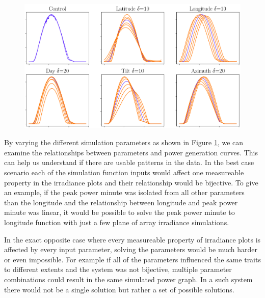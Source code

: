 \newpage



\begin{figure}[ht!]
\centering
\includegraphics[width=0.9\linewidth]{pics/poa_eval_new_crop}
\label{fig_poa_different_parameters}
\end{figure}

\noindent By varying the different simulation parameters as shown in Figure \ref{fig_poa_different_parameters}, we can examine the relationships between parameters and power generation curves. This can help us understand if there are usable patterns in the data. In the best case scenario each of the simulation function inputs would affect one measureable property in the irradiance plots and their relationship would be bijective. To give an example, if the peak power minute was isolated from all other parameters than the longitude and the relationship between longitude and peak power minute was linear, it would be possible to solve the peak power minute to longitude function with just a few plane of array irradiance simulations.

In the exact opposite case where every measureable property of irradiance plots is affected by every input parameter, solving the parameters would be much harder or even impossible. For example if all of the parameters influenced the same traits to different extents and the system was not bijective, multiple parameter combinations could result in the same simulated power graph. In a such system there would not be a single solution but rather a set of possible solutions.

